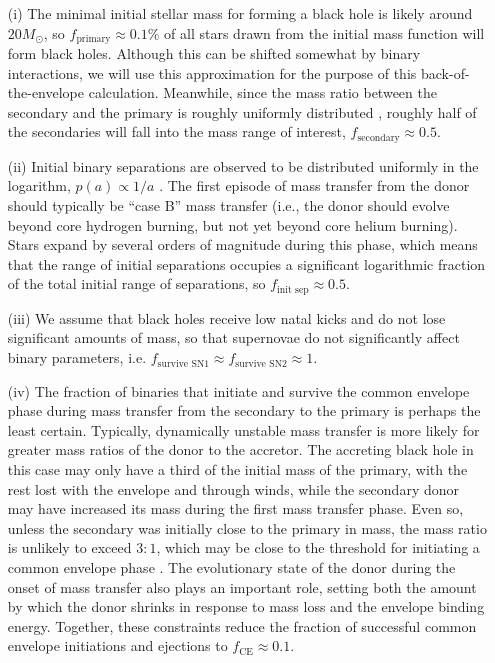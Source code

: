 \documentclass[review]{elsarticle}
\begin{document}
\begin{enumerate}
	\item[(i)] The minimal initial stellar mass for forming a black hole is likely around $20 M_\odot$, so $f_\textrm{primary} \approx 0.1\%$ of all stars drawn from the \citet{Kroupa:2002} initial mass function will form black holes. Although this can be shifted somewhat by binary interactions, we will use this approximation for the purpose of this back-of-the-envelope calculation. Meanwhile, since the mass ratio between the secondary and the primary is roughly uniformly distributed \citep{Sana:2012,MoeDiStefano:2017}, roughly half of the secondaries will fall into the mass range of interest, $f_\textrm{secondary} \approx 0.5$.  

\item[(ii)] Initial binary  separations are observed to be distributed uniformly in the logarithm, $p(a) \propto 1/a$ \citep{Opik:1924}.  The first episode of mass transfer from the donor should typically be ``case B'' mass transfer (i.e., the donor should evolve beyond core hydrogen burning, but not yet beyond core helium burning).  Stars expand by several orders of magnitude during this phase, which means that the range of initial separations occupies a significant logarithmic fraction of the total initial range of separations, so $f_\textrm{init sep} \approx 0.5$.  

\item[(iii)]  We assume that black holes receive low natal kicks and do not lose significant amounts of mass, so that supernovae do not significantly affect binary parameters, i.e. $f_\textrm{survive SN1} \approx f_\textrm{survive SN2} \approx 1$.  

\item[(iv)] The fraction of binaries that initiate and survive the common envelope phase during mass transfer from the secondary to the primary is perhaps the least certain.  Typically, dynamically unstable mass transfer is more likely for greater mass ratios of the donor to the accretor.  The accreting black hole in this case may only have a third of the initial mass of the primary, with the rest lost with the envelope and through winds, while the secondary donor may have increased its mass during the first mass transfer phase.  Even so, unless the secondary was initially close to the primary in mass, the mass ratio is unlikely to exceed $3:1$, which may be close to the threshold for initiating a common envelope phase \citep[e.g.,][]{Claeys:2014}.  The evolutionary state of the donor during the onset of mass transfer also plays an important role, setting both the amount by which the donor shrinks in response to mass loss and the envelope binding energy.  Together, these constraints reduce the fraction of successful common envelope initiations and ejections to $f_\textrm{CE} \approx 0.1$.  


\end{enumerate}
\end{document}
